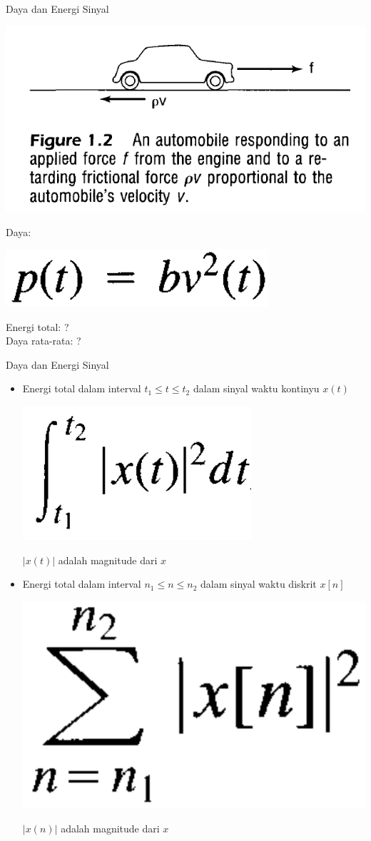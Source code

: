 \documentclass[pdflatex,compress,mathserif]{beamer}
\begin{document}
\begin{frame}{Daya dan Energi Sinyal}
	\begin{multicols}{2}
		\begin{center}
			\includegraphics[width=\linewidth]{img/img02}
		\end{center}
		\columnbreak
		Daya:\\
		\begin{center}
			\includegraphics[width=0.5\linewidth]{img/img11}
		\end{center}
		Energi total: ? \\
		Daya rata-rata: ?\\
	\end{multicols}
\end{frame}

\begin{frame}{Daya dan Energi Sinyal}
	\begin{itemize}
		\item Energi total dalam interval $ t_1 \leq t \leq t_2 $ dalam sinyal waktu kontinyu $ x(t) $
		\begin{center}
			\includegraphics[width=0.2\linewidth]{img/img12}
		\end{center}
		$ |x(t)| $ adalah magnitude dari $ x $
		
		\item Energi total dalam interval $ n_1 \leq n \leq n_2 $ dalam sinyal waktu diskrit $ x[n] $
		\begin{center}
			\includegraphics[width=0.2\linewidth]{img/img13}
		\end{center}
		$ |x(n)| $ adalah magnitude dari $ x $
	\end{itemize}
\end{frame}
\end{document}
